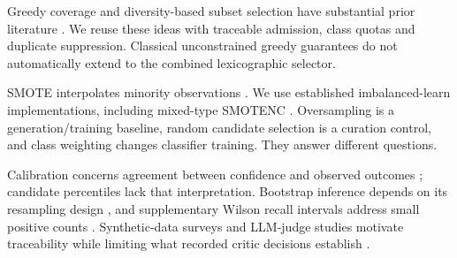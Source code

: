 Greedy coverage and diversity-based subset selection have substantial prior literature \citep{nemhauser1978submodular,sener2018coreset}. We reuse these ideas with traceable admission, class quotas and duplicate suppression. Classical unconstrained greedy guarantees do not automatically extend to the combined lexicographic selector.

SMOTE interpolates minority observations \citep{chawla2002smote}. We use established imbalanced-learn implementations, including mixed-type SMOTENC \citep{lemaitre2017imbalanced}. Oversampling is a generation/training baseline, random candidate selection is a curation control, and class weighting changes classifier training. They answer different questions.

Calibration concerns agreement between confidence and observed outcomes \citep{guo2017calibration}; candidate percentiles lack that interpretation. Bootstrap inference depends on its resampling design \citep{efron1979bootstrap}, and supplementary Wilson recall intervals address small positive counts \citep{brown2001interval}. Synthetic-data surveys and LLM-judge studies motivate traceability while limiting what recorded critic decisions establish \citep{long2024survey,zheng2023judging}.
